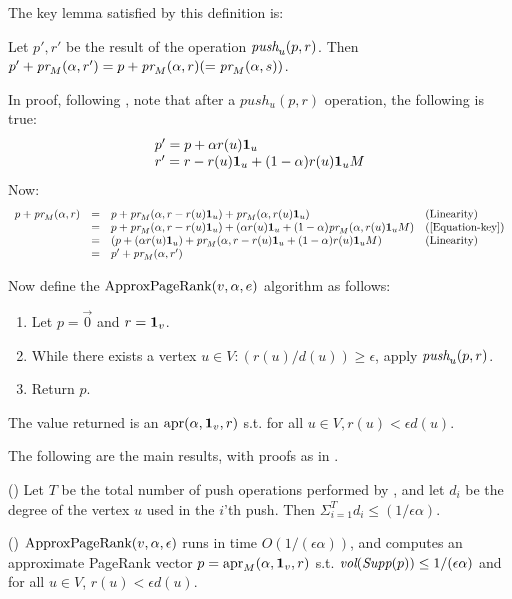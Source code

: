 \documentclass{article} %
\begin{document}
The key lemma satisfied by this definition is:
\begin{lemma}
Let $p',r'$ be the result of the operation $\mbox{\em push}_u(p,r)$. Then $p'+\mbox{\em pr}_M(\alpha,r')=p+\mbox{\em pr}_M(\alpha,r) (=\mbox{\em pr}_M(\alpha,s))$. 
\end{lemma}
In proof, following \cite[Appendix]{Andersen-2006}, note that after a $push_u(p,r)$ operation, the following is true:
\[
\begin{array}{l}
  p' = p + \alpha r(u) {\bf 1}_u\\
  r' = r - r(u) {\bf 1}_u + (1-\alpha)r(u){\bf 1}_uM
\end{array}
\]
Now:
$$
\begin{array}{llll}
 p+\mbox{\em pr}_M(\alpha,r) &=& p+\mbox{\em pr}_M(\alpha, r- r(u){\bf 1}_u) + \mbox{\em pr}_M(\alpha, r(u){\bf 1}_u) & \mbox{(Linearity)}\\
&=& p+\mbox{\em pr}_M(\alpha, r- r(u){\bf 1}_u) + (\alpha r(u){\bf 1}_u + (1-\alpha)\mbox{\em pr}_M(\alpha, r(u){\bf 1}_u M) & \mbox{(\ref{Equation-key})}\\
&=& (p+ (\alpha r(u){\bf 1}_u) + \mbox{\em pr}_M(\alpha, r- r(u){\bf 1}_u + (1-\alpha)r(u){\bf 1}_u M) & \mbox{(Linearity)}\\
&=& p'+\mbox{\em pr}_M(\alpha,r')
\end{array}
$$

Now define the $\mbox{ApproxPageRank}(v,\alpha,e)$ algorithm as follows:
\begin{enumerate}
\item Let $p=\vec{0}$ and $r={\bf 1}_v$.
\item While there exists a vertex $u\in V: (r(u)/d(u)) \geq \epsilon$, apply $\mbox{\em push}_u(p,r)$.
\item Return $p$.
\end{enumerate}
The value returned is an $\mbox{apr}(\alpha,{\bf 1}_v, r)$ s.t. for all $u \in V, r(u)< \epsilon d(u)$. 

The following are the main results, with proofs as in \cite[Appendix]{Andersen-2006}.

\begin{lemma}(\cite[Lemma 2]{Andersen-2006}) Let $T$ be the total number of push operations performed by \APR, and let $d_i$ be the degree of the vertex $u$ used in the $i$'th push. Then $\Sigma_{i=1}^T d_i \leq (1/\epsilon \alpha)$.
\end{lemma}

\begin{theorem}(\cite[Theorem 1]{Andersen-2006})
  $\mbox{ApproxPageRank}(v,\alpha,\epsilon)$ runs in time $O(1/(\epsilon \alpha))$, and computes an approximate PageRank vector $p=\mbox{apr}_M(\alpha, {\bf 1}_v,r)$ s.t. $\mbox{\em vol}(\mbox{\em Supp}(p))\leq 1/(\epsilon\alpha)$ and for all $u\in V$, $r(u) < \epsilon d(u)$.
\end{theorem}
\end{document}
